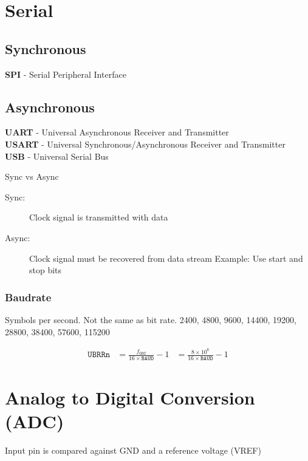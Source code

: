 \section{Serial}
\subsection{Synchronous}
\textbf{SPI} - Serial Peripheral Interface

\subsection{Asynchronous}
\textbf{UART} - Universal Asynchronous Receiver and Transmitter\\
\textbf{USART} - Universal Synchronous/Asynchronous Receiver and Transmitter\\
\textbf{USB} - Universal Serial Bus

\begin{note}{Sync vs Async}
	\begin{description}
		\item[Sync:] Clock signal is transmitted with data
		\item[Async:] Clock signal must be recovered from data stream
		\subitem Example: Use start and stop bits
	\end{description}
\end{note}

\subsubsection{Baudrate}
Symbols per second. Not the same as bit rate. 2400, 4800, 9600, 14400, 19200, 28800, 38400, 57600, 115200

\begin{align*}
	\texttt{UBRRn} &= \frac{f_{\texttt{OSC}}}{16\times \texttt{BAUD}} - 1
	&= \frac{8\times10^6}{16\times\texttt{BAUD}} - 1	
\end{align*}

\section{Analog to Digital Conversion (ADC)}
Input pin is compared against GND and a reference voltage (VREF)